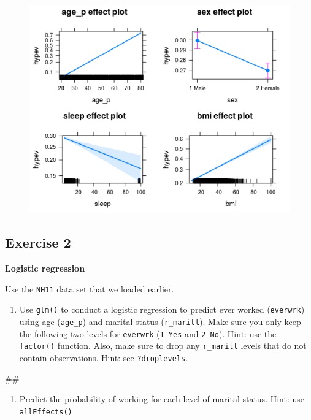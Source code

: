 \documentclass[]{book}
\newenvironment{Shaded}{\begin{snugshade}}{\end{snugshade}}
\newcommand{\NormalTok}[1]{#1}
\providecommand{\tightlist}{%
  \setlength{\itemsep}{0pt}\setlength{\parskip}{0pt}}
\begin{document}
\begin{figure}
\centering
\includegraphics{R/Rmodels/images/effects1.png}
\caption{}
\end{figure}

\subsection{Exercise 2}\label{exercise-2}

\textbf{Logistic regression}

Use the \texttt{NH11} data set that we loaded earlier.

\begin{enumerate}
\def\labelenumi{\arabic{enumi}.}
\tightlist
\item
  Use \texttt{glm()} to conduct a logistic regression to predict ever
  worked (\texttt{everwrk}) using age (\texttt{age\_p}) and marital
  status (\texttt{r\_maritl}). Make sure you only keep the following two
  levels for \texttt{everwrk} (\texttt{1\ Yes} and \texttt{2\ No}).
  Hint: use the \texttt{factor()} function. Also, make sure to drop any
  \texttt{r\_maritl} levels that do not contain observations. Hint: see
  \texttt{?droplevels}.
\end{enumerate}

\begin{Shaded}
\begin{Highlighting}[]
\NormalTok{## }
\end{Highlighting}
\end{Shaded}

\begin{enumerate}
\def\labelenumi{\arabic{enumi}.}
\setcounter{enumi}{1}
\tightlist
\item
  Predict the probability of working for each level of marital status.
  Hint: use \texttt{allEffects()}
\end{enumerate}
\end{document}
